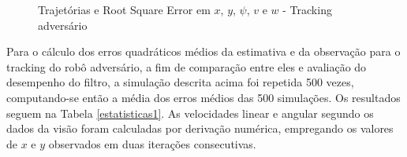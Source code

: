 \documentclass[a4paper,11pt]{article}
\begin{document}
\begin{figure}[!ht]
{    }
    \hfill
    \hfill
    \caption{Trajetórias e Root Square Error em $x$, $y$, $\psi$, $v$ e $w$ - Tracking adversário}
    \label{estatisticas_adversario}
  \end{figure}
  

  
Para o cálculo dos erros quadráticos médios da estimativa e da observação para o tracking do robô adversário, a fim de comparação entre eles e avaliação do desempenho do filtro, a simulação descrita acima foi repetida 500 vezes, computando-se então a média dos erros médios das 500 simulações. Os resultados seguem na Tabela \ref{estatisticas1}. As velocidades linear e angular segundo os dados da visão foram calculadas por derivação numérica, empregando os valores de $x$ e $y$ observados em duas iterações consecutivas.
\end{document}
